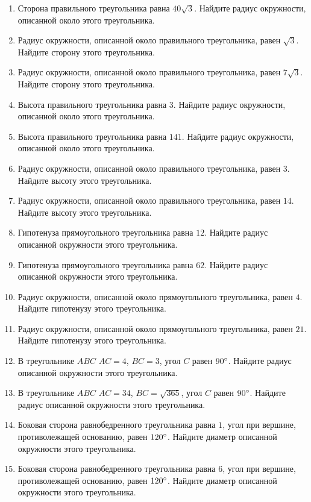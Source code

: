 \documentclass[12pt, a4paper]{article}
\begin{document}
\begin{enumerate}
		\item Сторона правильного треугольника равна \( 40\sqrt{3}\). Найдите радиус окружности, описанной около этого треугольника.
		\item Радиус окружности, описанной около правильного треугольника, равен \( \sqrt{3} \). Найдите сторону этого треугольника.
		\item Радиус окружности, описанной около правильного треугольника, равен \( 7\sqrt{3} \). Найдите сторону этого треугольника.
		\item Высота правильного треугольника равна \( 3 \). Найдите радиус окружности, описанной около этого треугольника.
		\item Высота правильного треугольника равна \( 141 \). Найдите радиус окружности, описанной около этого треугольника.
		\item Радиус окружности, описанной около правильного треугольника, равен \( 3 \). Найдите высоту этого треугольника.
		\item Радиус окружности, описанной около правильного треугольника, равен \( 14 \). Найдите высоту этого треугольника.
		\item Гипотенуза прямоугольного треугольника равна \( 12 \). Найдите радиус описанной окружности этого треугольника.
		\item Гипотенуза прямоугольного треугольника равна \( 62 \). Найдите радиус описанной окружности этого треугольника.
		\item Радиус окружности, описанной около прямоугольного треугольника, равен \( 4 \). Найдите гипотенузу этого треугольника.
		\item Радиус окружности, описанной около прямоугольного треугольника, равен \( 21 \). Найдите гипотенузу этого треугольника.
		\item В треугольнике \( ABC  \) \( AC=4 \), \( BC=3 \), угол \( C \) равен \( 90\degree\). Найдите радиус описанной окружности этого треугольника.
		\item В треугольнике \( ABC  \) \( AC=34 \), \( BC=\sqrt{365} \), угол \( C \) равен \( 90\degree  \). Найдите радиус описанной окружности этого треугольника.
		\item Боковая сторона равнобедренного треугольника равна \( 1 \), угол при вершине, противолежащей основанию, равен \( 120\degree\). Найдите диаметр описанной окружности этого треугольника.
		\item Боковая сторона равнобедренного треугольника равна \( 6 \), угол при вершине, противолежащей основанию, равен \( 120  \degree\). Найдите диаметр описанной окружности этого треугольника.

\end{enumerate}
\end{document}
